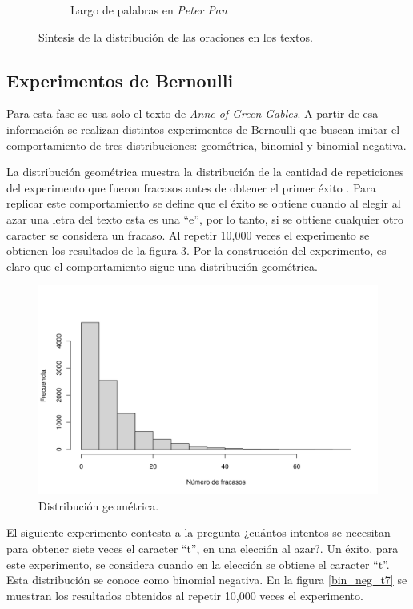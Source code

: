 \documentclass[12pt]{article}
\begin{document}
\begin{figure}
\begin{subfigure}{0.5\textwidth}
			\caption{Largo de palabras en \em Peter Pan}
			\label{tpalabras_peter}
		\end{subfigure}
		\caption{Síntesis de la distribución de las oraciones en los textos.}
		\label{anne_peter}
	\end{figure}

 
	
	\subsection{Experimentos de Bernoulli}
	
	Para esta fase se usa solo el texto de {\em Anne of Green Gables}. A partir de esa información se realizan distintos experimentos de Bernoulli que buscan imitar el comportamiento de tres distribuciones: geométrica, binomial y binomial negativa.
	
	La distribución geométrica muestra la distribución de la cantidad de repeticiones del experimento que fueron fracasos antes de obtener el primer éxito \cite{notas_mpa}. Para replicar este comportamiento se define que el éxito se obtiene cuando al elegir al azar una letra del texto esta es una ``e'', por lo tanto, si se obtiene cualquier otro caracter se considera un fracaso. Al repetir 10,000 veces el experimento se obtienen los resultados de la figura \ref{geom_e}. Por la construcción del experimento, es claro que el comportamiento sigue una distribución geométrica.
	
	\begin{figure}
		\centering
		\includegraphics[scale=0.6]{geom_e.png}
		\caption{Distribución geométrica.}
		\label{geom_e}
	\end{figure}

	El siguiente experimento contesta a la pregunta ¿cuántos intentos se necesitan para obtener siete veces el caracter ``t'', en una elección al azar?. Un éxito, para este experimento, se considera cuando en la elección se obtiene el caracter ``t''. Esta distribución se conoce como binomial negativa. En la figura \ref{bin_neg_t7} se muestran los resultados obtenidos al repetir 10,000 veces el experimento.
	
\end{document}
